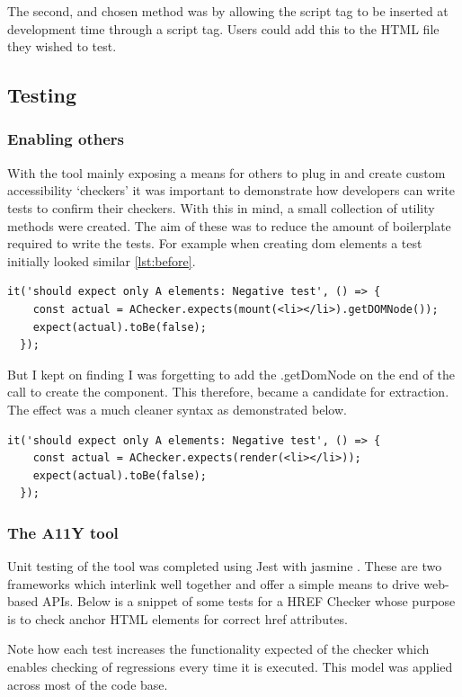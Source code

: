 The second, and chosen method was by allowing the script tag to be inserted
at development time through a script tag. Users could add this to the HTML
file they wished to test.

\subsection{Testing}
\subsubsection{Enabling others}
With the tool mainly exposing a means for others to plug in and create custom
accessibility `checkers' it was important to demonstrate how developers can
write tests to confirm their checkers. With this in mind, a small collection
of utility methods were created. The aim of these was to reduce the amount of
boilerplate required to write the tests. For example when creating dom
elements a test initially looked similar \ref{lst:before}.
\begin{lstlisting}[label={lst:before}]
  it('should expect only A elements: Negative test', () => {
    const actual = AChecker.expects(mount(<li></li>).getDOMNode());
    expect(actual).toBe(false);
  });
\end{lstlisting}

But I kept on finding I was forgetting to add the .getDomNode on the end of
the call to create the component. This therefore, became a candidate for
extraction. The effect was a much cleaner syntax as demonstrated below.

\begin{lstlisting}[label={lst:before}]
  it('should expect only A elements: Negative test', () => {
    const actual = AChecker.expects(render(<li></li>));
    expect(actual).toBe(false);
  });
\end{lstlisting}


\subsubsection{The A11Y tool}
Unit testing of the tool was completed using Jest \citep{jest} with jasmine
\citep{jasmine}. These are two frameworks which interlink well
together and offer a simple means to drive web-based APIs. Below is a snippet
of some tests for a HREF Checker whose purpose is to check anchor HTML elements
for correct href attributes.

Note how each test increases the functionality expected of the checker which
enables checking of regressions every time it is executed. This model was
applied across most of the code base.

